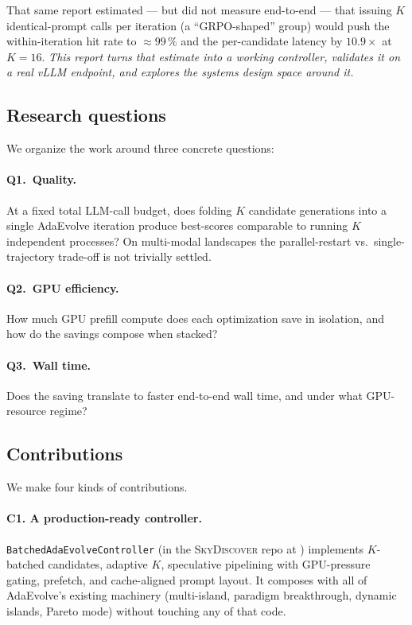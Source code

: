 \documentclass[11pt]{article}
\newcommand{\skyd}{\textsc{SkyDiscover}}
\newcommand{\adaev}{AdaEvolve}
\newcommand{\bcontroller}{\texttt{BatchedAdaEvolveController}}
\begin{document}
That same report estimated --- but did not measure end-to-end --- that
issuing $K$ identical-prompt calls per iteration (a ``GRPO-shaped''
group) would push the within-iteration hit rate to $\approx 99\,\%$
and the per-candidate latency by $10.9\times$ at $K{=}16$. \emph{This
report turns that estimate into a working controller, validates it on
a real vLLM endpoint, and explores the systems design space around
it.}

\subsection{Research questions}
\label{sec:research-questions}

We organize the work around three concrete questions:

\paragraph{Q1.~Quality.}
At a fixed total LLM-call budget, does folding $K$ candidate
generations into a single \adaev{} iteration produce best-scores
comparable to running $K$ independent processes? On multi-modal
landscapes the parallel-restart vs.~single-trajectory trade-off is not
trivially settled.

\paragraph{Q2.~GPU efficiency.}
How much GPU prefill compute does each optimization save in
isolation, and how do the savings compose when stacked?

\paragraph{Q3.~Wall time.}
Does the saving translate to faster end-to-end wall time, and under
what GPU-resource regime?

\subsection{Contributions}

We make four kinds of contributions.

\paragraph{C1. A production-ready controller.}
\bcontroller{} (in the \skyd{} repo at
) implements $K$-batched
candidates, adaptive $K$, speculative pipelining with GPU-pressure
gating, prefetch, and cache-aligned prompt layout. It composes with
all of \adaev{}'s existing machinery (multi-island, paradigm
breakthrough, dynamic islands, Pareto mode) without touching any of
that code.
\end{document}
